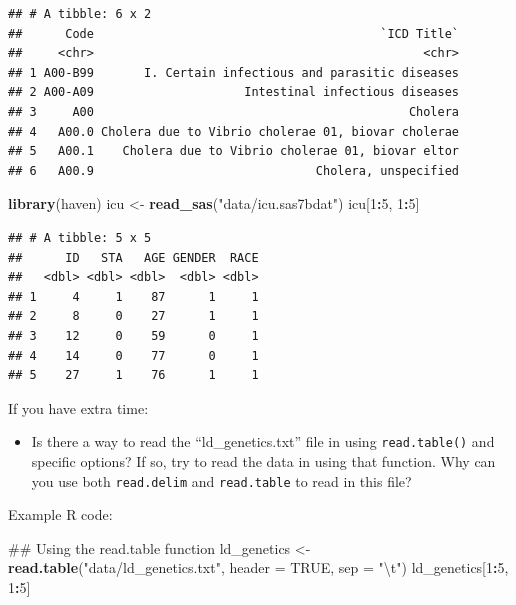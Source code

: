 \documentclass[]{book}
\makeatletter
\newenvironment{Shaded}{\begin{snugshade}}{\end{snugshade}}
\newcommand{\KeywordTok}[1]{\textcolor[rgb]{0.13,0.29,0.53}{\textbf{#1}}}
\newcommand{\DataTypeTok}[1]{\textcolor[rgb]{0.13,0.29,0.53}{#1}}
\newcommand{\DecValTok}[1]{\textcolor[rgb]{0.00,0.00,0.81}{#1}}
\newcommand{\CharTok}[1]{\textcolor[rgb]{0.31,0.60,0.02}{#1}}
\newcommand{\StringTok}[1]{\textcolor[rgb]{0.31,0.60,0.02}{#1}}
\newcommand{\OtherTok}[1]{\textcolor[rgb]{0.56,0.35,0.01}{#1}}
\newcommand{\OperatorTok}[1]{\textcolor[rgb]{0.81,0.36,0.00}{\textbf{#1}}}
\newcommand{\NormalTok}[1]{#1}
\providecommand{\tightlist}{%
  \setlength{\itemsep}{0pt}\setlength{\parskip}{0pt}}
\newenvironment{kframe}{%
\medskip{}
\setlength{\fboxsep}{.8em}
 \def\at@end@of@kframe{}%
 \ifinner\ifhmode%
  \def\at@end@of@kframe{\end{minipage}}%
  \begin{minipage}{\columnwidth}%
 \fi\fi%
 \def\FrameCommand##1{\hskip\@totalleftmargin \hskip-\fboxsep
 \colorbox{shadecolor}{##1}\hskip-\fboxsep
     \hskip-\linewidth \hskip-\@totalleftmargin \hskip\columnwidth}%
 \MakeFramed {\advance\hsize-\width
   \@totalleftmargin\z@ \linewidth\hsize
   \@setminipage}}%
 {\par\unskip\endMakeFramed%
 \at@end@of@kframe}
\renewenvironment{Shaded}{\begin{kframe}}{\end{kframe}}
\theoremstyle{definition}
\theoremstyle{definition}
\theoremstyle{definition}
\theoremstyle{remark}
\makeatother
\begin{document}
\begin{verbatim}
## # A tibble: 6 x 2
##      Code                                        `ICD Title`
##     <chr>                                              <chr>
## 1 A00-B99       I. Certain infectious and parasitic diseases
## 2 A00-A09                     Intestinal infectious diseases
## 3     A00                                            Cholera
## 4   A00.0 Cholera due to Vibrio cholerae 01, biovar cholerae
## 5   A00.1    Cholera due to Vibrio cholerae 01, biovar eltor
## 6   A00.9                               Cholera, unspecified
\end{verbatim}

\begin{Shaded}
\begin{Highlighting}[]
\KeywordTok{library}\NormalTok{(haven)}
\NormalTok{icu <-}\StringTok{ }\KeywordTok{read_sas}\NormalTok{(}\StringTok{"data/icu.sas7bdat"}\NormalTok{)}
\NormalTok{icu[}\DecValTok{1}\OperatorTok{:}\DecValTok{5}\NormalTok{, }\DecValTok{1}\OperatorTok{:}\DecValTok{5}\NormalTok{]}
\end{Highlighting}
\end{Shaded}

\begin{verbatim}
## # A tibble: 5 x 5
##      ID   STA   AGE GENDER  RACE
##   <dbl> <dbl> <dbl>  <dbl> <dbl>
## 1     4     1    87      1     1
## 2     8     0    27      1     1
## 3    12     0    59      0     1
## 4    14     0    77      0     1
## 5    27     1    76      1     1
\end{verbatim}

If you have extra time:

\begin{itemize}
\tightlist
\item
  Is there a way to read the ``ld\_genetics.txt'' file in using
  \texttt{read.table()} and specific options? If so, try to read the
  data in using that function. Why can you use both \texttt{read.delim}
  and \texttt{read.table} to read in this file?
\end{itemize}

Example R code:

\begin{Shaded}
\begin{Highlighting}[]
\NormalTok{## Using the read.table function }
\NormalTok{ld_genetics <-}\StringTok{ }\KeywordTok{read.table}\NormalTok{(}\StringTok{"data/ld_genetics.txt"}\NormalTok{, }\DataTypeTok{header =} \OtherTok{TRUE}\NormalTok{,}
                          \DataTypeTok{sep =} \StringTok{"}\CharTok{\textbackslash{}t}\StringTok{"}\NormalTok{)}
\NormalTok{ld_genetics[}\DecValTok{1}\OperatorTok{:}\DecValTok{5}\NormalTok{, }\DecValTok{1}\OperatorTok{:}\DecValTok{5}\NormalTok{]}
\end{Highlighting}
\end{Shaded}
\end{document}
